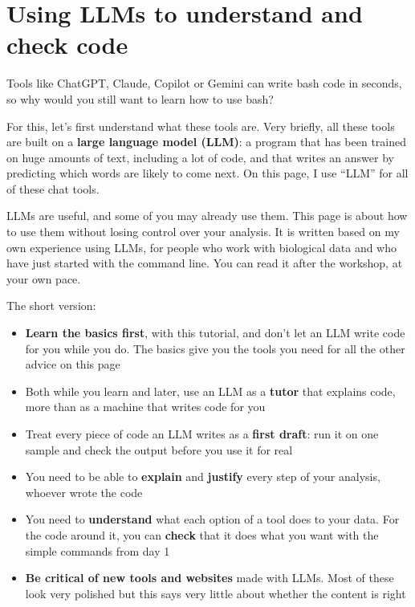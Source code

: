 \documentclass[
  letterpaper,
  DIV=11,
  numbers=noendperiod]{scrreprt}
\author{}
\date{}
\providecommand{\tightlist}{%
  \setlength{\itemsep}{0pt}\setlength{\parskip}{0pt}}
\renewcommand*\contentsname{Table of contents}
\newcommand\contentsname{Table of contents}
\begin{document}

\renewcommand*\contentsname{Table of contents}
{
\hypersetup{linkcolor=}
\setcounter{tocdepth}{2}
\tableofcontents
}

\chapter{Using LLMs to understand and check
code}\label{using-llms-to-understand-and-check-code}

Tools like ChatGPT, Claude, Copilot or Gemini can write bash code in
seconds, so why would you still want to learn how to use bash?

For this, let's first understand what these tools are. Very briefly, all
these tools are built on a \textbf{large language model (LLM)}: a
program that has been trained on huge amounts of text, including a lot
of code, and that writes an answer by predicting which words are likely
to come next. On this page, I use ``LLM'' for all of these chat tools.

LLMs are useful, and some of you may already use them. This page is
about how to use them without losing control over your analysis. It is
written based on my own experience using LLMs, for people who work with
biological data and who have just started with the command line. You can
read it after the workshop, at your own pace.

The short version:

\begin{itemize}
\tightlist
\item
  \textbf{Learn the basics first}, with this tutorial, and don't let an
  LLM write code for you while you do. The basics give you the tools you
  need for all the other advice on this page
\item
  Both while you learn and later, use an LLM as a \textbf{tutor} that
  explains code, more than as a machine that writes code for you
\item
  Treat every piece of code an LLM writes as a \textbf{first draft}: run
  it on one sample and check the output before you use it for real
\item
  You need to be able to \textbf{explain} and \textbf{justify} every
  step of your analysis, whoever wrote the code
\item
  You need to \textbf{understand} what each option of a tool does to
  your data. For the code around it, you can \textbf{check} that it does
  what you want with the simple commands from day 1
\item
  \textbf{Be critical of new tools and websites} made with LLMs. Most of
  these look very polished but this says very little about whether the
  content is right
\end{itemize}
\end{document}
